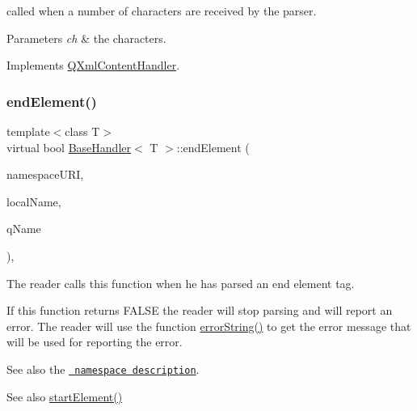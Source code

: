 called when a number of characters are received by the parser. 
\begin{DoxyParams}{Parameters}
{\em ch} & the characters. \\
\hline
\end{DoxyParams}


Implements \mbox{\hyperlink{class_q_xml_content_handler_a3be0d440b48836560c8805e15d596eb1}{Q\+Xml\+Content\+Handler}}.

\mbox{\label{class_base_handler_aa1b987506d2f962ba478b8bab388bff9}} 
\subsubsection{\texorpdfstring{endElement()}{endElement()}}
{\footnotesize\ttfamily template$<$class T$>$ \\
virtual bool \mbox{\hyperlink{class_base_handler}{Base\+Handler}}$<$ T $>$\+::end\+Element (\begin{DoxyParamCaption}\item[{const \mbox{\hyperlink{class_q_string}{Q\+String}} \&}]{namespace\+U\+RI,  }\item[{const \mbox{\hyperlink{class_q_string}{Q\+String}} \&}]{local\+Name,  }\item[{const \mbox{\hyperlink{class_q_string}{Q\+String}} \&}]{q\+Name }\end{DoxyParamCaption})\hspace{0.3cm}{\ttfamily [inline]}, {\ttfamily [virtual]}}

The reader calls this function when he has parsed an end element tag.

If this function returns F\+A\+L\+SE the reader will stop parsing and will report an error. The reader will use the function \mbox{\hyperlink{class_q_xml_default_handler_afcbe5fdce86cea4b7863e752c2413c45}{error\+String()}} to get the error message that will be used for reporting the error.

See also the \href{xml-sax.html\#namespaces}{\texttt{ namespace description}}.

\begin{DoxySeeAlso}{See also}
\mbox{\hyperlink{class_base_handler_a15c20baf7065b3eb92ae7a336ccdf20b}{start\+Element()}} 
\end{DoxySeeAlso}


